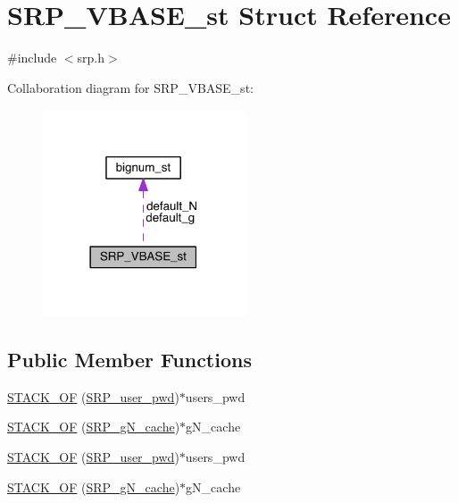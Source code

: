 \hypertarget{struct_s_r_p___v_b_a_s_e__st}{}\section{S\+R\+P\+\_\+\+V\+B\+A\+S\+E\+\_\+st Struct Reference}
\label{struct_s_r_p___v_b_a_s_e__st}


{\ttfamily \#include $<$srp.\+h$>$}



Collaboration diagram for S\+R\+P\+\_\+\+V\+B\+A\+S\+E\+\_\+st\+:\nopagebreak
\begin{figure}[H]
\begin{center}
\leavevmode
\includegraphics[width=170pt]{struct_s_r_p___v_b_a_s_e__st__coll__graph}
\end{center}
\end{figure}
\subsection*{Public Member Functions}
\begin{DoxyCompactItemize}
\item 
\hyperlink{struct_s_r_p___v_b_a_s_e__st_ae2fc86dfa5f59f6c7aba0299f65c8b68}{S\+T\+A\+C\+K\+\_\+\+OF} (\hyperlink{crypto_2srp_2srp_8h_a06cf6af0b10520e22f47907f57af5832}{S\+R\+P\+\_\+user\+\_\+pwd})$\ast$users\+\_\+pwd
\item 
\hyperlink{struct_s_r_p___v_b_a_s_e__st_ac5047c46df49ba76354d1fa884a81b92}{S\+T\+A\+C\+K\+\_\+\+OF} (\hyperlink{crypto_2srp_2srp_8h_a80d3045219f016b8ec07f4a66eb4b9a9}{S\+R\+P\+\_\+g\+N\+\_\+cache})$\ast$g\+N\+\_\+cache
\item 
\hyperlink{struct_s_r_p___v_b_a_s_e__st_ae2fc86dfa5f59f6c7aba0299f65c8b68}{S\+T\+A\+C\+K\+\_\+\+OF} (\hyperlink{crypto_2srp_2srp_8h_a06cf6af0b10520e22f47907f57af5832}{S\+R\+P\+\_\+user\+\_\+pwd})$\ast$users\+\_\+pwd
\item 
\hyperlink{struct_s_r_p___v_b_a_s_e__st_ac5047c46df49ba76354d1fa884a81b92}{S\+T\+A\+C\+K\+\_\+\+OF} (\hyperlink{crypto_2srp_2srp_8h_a80d3045219f016b8ec07f4a66eb4b9a9}{S\+R\+P\+\_\+g\+N\+\_\+cache})$\ast$g\+N\+\_\+cache
\end{DoxyCompactItemize}
